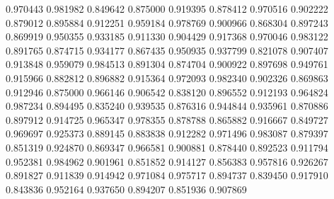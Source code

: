 0.970443
0.981982
0.849642
0.875000
0.919395
0.878412
0.970516
0.902222
0.879012
0.895884
0.912251
0.959184
0.978769
0.900966
0.868304
0.897243
0.869919
0.950355
0.933185
0.911330
0.904429
0.917368
0.970046
0.983122
0.891765
0.874715
0.934177
0.867435
0.950935
0.937799
0.821078
0.907407
0.913848
0.959079
0.984513
0.891304
0.874704
0.900922
0.897698
0.949761
0.915966
0.882812
0.896882
0.915364
0.972093
0.982340
0.902326
0.869863
0.912946
0.875000
0.966146
0.906542
0.838120
0.896552
0.912193
0.964824
0.987234
0.894495
0.835240
0.939535
0.876316
0.944844
0.935961
0.870886
0.897912
0.914725
0.965347
0.978355
0.878788
0.865882
0.916667
0.849727
0.969697
0.925373
0.889145
0.883838
0.912282
0.971496
0.983087
0.879397
0.851319
0.924870
0.869347
0.966581
0.900881
0.878440
0.892523
0.911794
0.952381
0.984962
0.901961
0.851852
0.914127
0.856383
0.957816
0.926267
0.891827
0.911839
0.914942
0.971084
0.975717
0.894737
0.839450
0.917910
0.843836
0.952164
0.937650
0.894207
0.851936
0.907869
